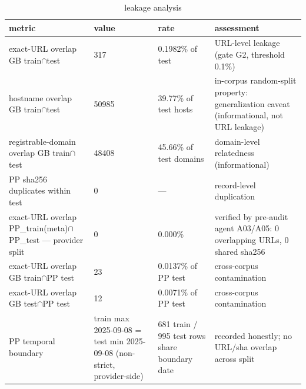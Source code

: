 \begin{table}[htbp]
\caption{leakage analysis}
\label{tab:leakage_analysis}
\begin{tabular}{llll}
\toprule
metric & value & rate & assessment \\
\midrule
exact-URL overlap GB train$\cap$test & 317 & 0.1982\% of test & URL-level leakage (gate G2, threshold 0.1\%) \\
hostname overlap GB train$\cap$test & 50985 & 39.77\% of test hosts & in-corpus random-split property: generalization caveat (informational, not URL leakage) \\
registrable-domain overlap GB train$\cap$test & 48408 & 45.66\% of test domains & domain-level relatedness (informational) \\
PP sha256 duplicates within test & 0 & --- & record-level duplication \\
exact-URL overlap PP\_train(meta)$\cap$PP\_test --- provider split & 0 & 0.000\% & verified by pre-audit agent A03/A05: 0 overlapping URLs, 0 shared sha256 \\
exact-URL overlap GB train$\cap$PP test & 23 & 0.0137\% of PP test & cross-corpus contamination \\
exact-URL overlap GB test$\cap$PP test & 12 & 0.0071\% of PP test & cross-corpus contamination \\
PP temporal boundary & train max 2025-09-08 = test min 2025-09-08 (non-strict, provider-side) & 681 train / 995 test rows share boundary date & recorded honestly; no URL/sha overlap across split \\
\bottomrule
\end{tabular}
\end{table}
